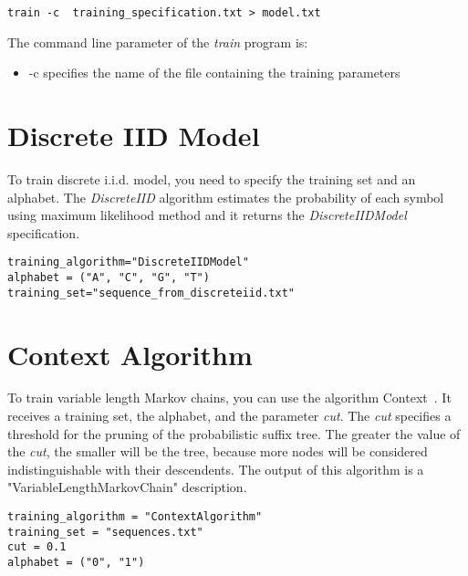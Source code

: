 \begin{Verbatim}[frame=single, label={Command line}]
train -c  training_specification.txt > model.txt
\end{Verbatim}

The command line parameter of the \textit{train} program is:

\begin{itemize}
\item -c specifies the name of the file containing the training parameters
\end{itemize}

\section{Discrete IID Model}

To train discrete i.i.d. model, you need to specify the training set and an alphabet. The \textit{DiscreteIID} algorithm estimates the probability of each symbol using maximum likelihood method and it returns the \textit{DiscreteIIDModel} specification.

\vspace{1em}
\begin{minipage}{\textwidth}
\begin{Verbatim}[frame=single,  label={trainiid.txt}]
training_algorithm="DiscreteIIDModel"
alphabet = ("A", "C", "G", "T")
training_set="sequence_from_discreteiid.txt"
\end{Verbatim}
\end{minipage}
\vspace{1em}

\section{Context Algorithm}

To train variable length Markov chains, you can use the algorithm Context~\cite{Rissanen1983,Galves2008}. It receives a training set, the alphabet, and the parameter \textit{cut}. The \textit{cut} specifies a threshold for the pruning of the probabilistic suffix tree. The greater the value of the \textit{cut}, the smaller will be the tree, because more nodes will be considered indistinguishable with their descendents.   The output of this algorithm is a "VariableLengthMarkovChain" description.

\vspace{1em}
\begin{minipage}{\textwidth}
\begin{Verbatim}[frame=single,  label={bic.txt}]
training_algorithm = "ContextAlgorithm"
training_set = "sequences.txt"
cut = 0.1
alphabet = ("0", "1")
\end{Verbatim}
\end{minipage}
\vspace{1em}



